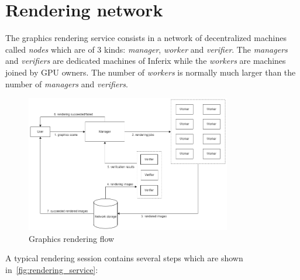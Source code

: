 \section[Rendering network]{Rendering network}
The graphics rendering service consists in a network of decentralized machines called \emph{nodes} which are of $3$ kinds: \emph{manager}, \emph{worker} and \emph{verifier}. The \emph{managers} and \emph{verifiers} are dedicated machines of Inferix while the \emph{workers} are machines joined by GPU owners. The number of \emph{workers} is normally much larger than the number of \emph{managers} and \emph{verifiers}.
\begin{figure}[h]
    \centering
    \includegraphics[width=0.8\textwidth]{rendering_service.png}
    \caption[Graphics rendering flow]{Graphics rendering flow}
    \label{fig:rendering_service}
\end{figure}
A typical rendering session contains several steps which are shown in~\autoref{fig:rendering_service}:

